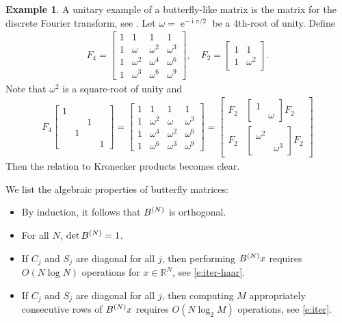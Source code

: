 \documentclass{amsart}
\theoremstyle{definition}
\newtheorem{example}[theorem]{Example}
\theoremstyle{remark}
\numberwithin{equation}{section}
\DeclareMathOperator{\E}{e}
\DeclareMathOperator{\I}{i}
\begin{document}
\begin{example}
  A unitary example of a butterfly-like matrix is the matrix for the discrete Fourier transform, see \cite[Section 1.4]{VanLoan1992}.  Let $\omega = \E^{- \I \pi/2}$ be a 4th-root of unity.  Define
  \begin{align}
    F_4 = \begin{bmatrix} 1 & 1 & 1 & 1\\
      1 & \omega & \omega^2 & \omega^3\\
      1 & \omega^2 & \omega^4 & \omega^6\\
      1 & \omega^3 & \omega^6 & \omega^9 \end{bmatrix}, \quad F_2 = \begin{bmatrix} 1 & 1 \\  1 & \omega^2 \end{bmatrix}.
  \end{align}
  Note that $\omega^2$ is a square-root of unity and
  \begin{align}
    F_4 \begin{bmatrix} 1 & \\ && 1 \\ &1 \\ &&& 1 \end{bmatrix} = \begin{bmatrix} 1 & 1 & 1 & 1\\
      1 & \omega^2 & \omega & \omega^3\\
      1 & \omega^4 & \omega^2 & \omega^6\\
      1 & \omega^6 & \omega^3 & \omega^9 \end{bmatrix} = \begin{bmatrix} F_2 & \begin{bmatrix} 1 \\ & \omega \end{bmatrix} F_2  \\
    F_2  &  \begin{bmatrix} \omega^2 &\\ & \omega^3 \end{bmatrix} F_2\end{bmatrix}
  \end{align}
  Then the relation to Kronecker products becomes clear.
\end{example}

\noindent We list the algebraic properties of butterfly matrices:
\begin{itemize}
\item By induction, it follows that $B^{(N)}$ is orthogonal.
\item For all $N$, $\det B^{(N)} = 1$.
\item If $C_j$ and $S_j$   are diagonal for all $j$, then performing $B^{(N)} x$ requires $O(N \log N)$ operations for $x \in \mathbb R^N$, see \eqref{e:iter-haar}.
\item If $C_j$ and $S_j$ are diagonal for all $j$, then computing $M$ appropriately consecutive rows of $B^{(N)} x $ requires $O(N \log_2 M)$ operations, see \eqref{e:iter}.
\end{itemize}
\end{document}
